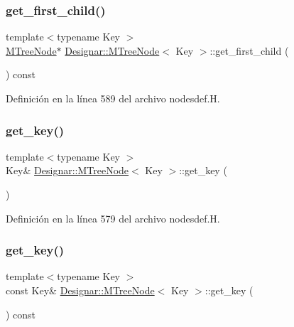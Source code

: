 \subsubsection{\texorpdfstring{get\+\_\+first\+\_\+child()}{get\_first\_child()}}
{\footnotesize\ttfamily template$<$typename Key $>$ \\
\hyperlink{class_designar_1_1_m_tree_node}{M\+Tree\+Node}$\ast$ \hyperlink{class_designar_1_1_m_tree_node}{Designar\+::\+M\+Tree\+Node}$<$ Key $>$\+::get\+\_\+first\+\_\+child (\begin{DoxyParamCaption}{ }\end{DoxyParamCaption}) const\hspace{0.3cm}{\ttfamily [inline]}}



Definición en la línea 589 del archivo nodesdef.\+H.

\mbox{\label{class_designar_1_1_m_tree_node_a6bccdf14efbc480aaa4d23c943b5a100}} 
\subsubsection{\texorpdfstring{get\+\_\+key()}{get\_key()}\hspace{0.1cm}{\footnotesize\ttfamily [1/2]}}
{\footnotesize\ttfamily template$<$typename Key $>$ \\
Key\& \hyperlink{class_designar_1_1_m_tree_node}{Designar\+::\+M\+Tree\+Node}$<$ Key $>$\+::get\+\_\+key (\begin{DoxyParamCaption}{ }\end{DoxyParamCaption})\hspace{0.3cm}{\ttfamily [inline]}}



Definición en la línea 579 del archivo nodesdef.\+H.

\mbox{\label{class_designar_1_1_m_tree_node_aaf4dc39561e8db6973db9c1b5a88b466}} 
\subsubsection{\texorpdfstring{get\+\_\+key()}{get\_key()}\hspace{0.1cm}{\footnotesize\ttfamily [2/2]}}
{\footnotesize\ttfamily template$<$typename Key $>$ \\
const Key\& \hyperlink{class_designar_1_1_m_tree_node}{Designar\+::\+M\+Tree\+Node}$<$ Key $>$\+::get\+\_\+key (\begin{DoxyParamCaption}{ }\end{DoxyParamCaption}) const\hspace{0.3cm}{\ttfamily [inline]}}



